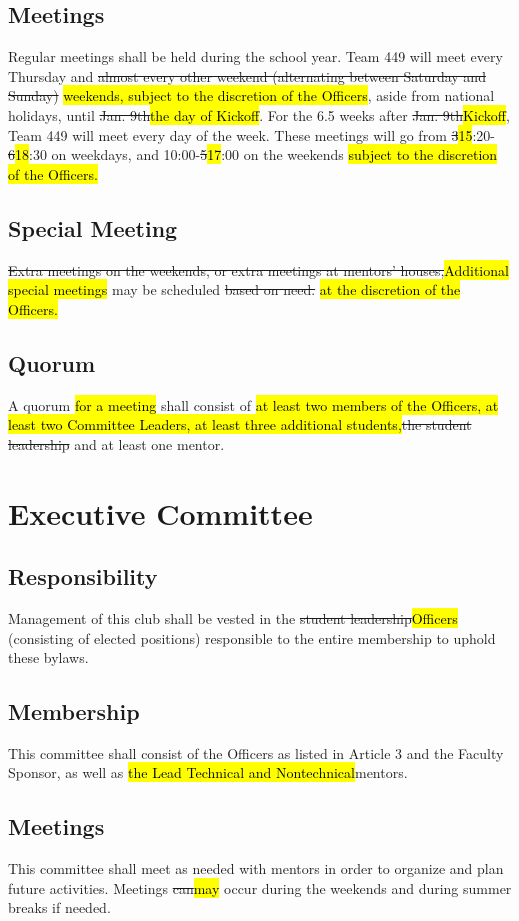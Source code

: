 \documentclass[12pt, a4paper]{article}
\begin{document}
\subsection{Meetings}
Regular meetings shall be held during the school year. 
Team 449 will meet every Thursday and \st{almost every other weekend (alternating between Saturday and Sunday)} \hl{weekends, subject to the discretion of the Officers}, aside from national holidays, until \st{Jan. 9th}\hl{the day of Kickoff}. 
For the 6.5 weeks after \st{Jan. 9th}\hl{Kickoff},  Team 449 will meet every day of the week.  
These meetings will go from \st{3}\hl{15}:20-\st{6}\hl{18}:30 on weekdays, and 10:00-\st{5}\hl{17}:00 on the weekends\hl{ subject to the discretion of the Officers.}
\subsection{Special Meeting}
\st{Extra meetings on the weekends, or extra meetings at mentors’ houses,}\hl{Additional special meetings} may be scheduled \st{based on need.} \hl{at the discretion of the Officers.}
\subsection{Quorum}
A quorum \hl{for a meeting} shall consist of \hl{at least two members of the Officers, at least two Committee Leaders, at least three additional students,}\st{the student leadership} and at least one mentor.

\section{Executive Committee}
\subsection{Responsibility}
Management of this club shall be vested in the \st{student leadership}\hl{Officers} (consisting of elected positions) responsible to the entire membership to uphold these bylaws.
\subsection{Membership}
This committee shall consist of the Officers as listed in Article 3 and the Faculty Sponsor, as well as \hl{the Lead Technical and Nontechnical}mentors.
\subsection{Meetings}
This committee shall meet as needed with mentors in order to organize and plan future activities. Meetings \st{can}\hl{may} occur during the weekends and during summer breaks if needed.
\end{document}
